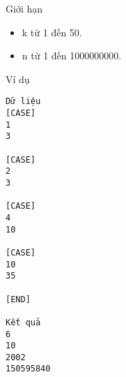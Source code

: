 Giới hạn  
\begin{itemize}
	\item     k từ 1 đến 50.   
	\item     n từ 1 đến 1000000000.   
\end{itemize}
   Ví dụ  
\begin{verbatim}
Dữ liệu
[CASE]
1
3

[CASE]
2
3

[CASE]
4
10

[CASE]
10
35

[END]

Kết quả
6
10
2002
150595840
\end{verbatim}